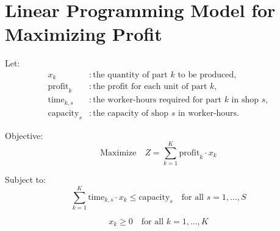 \documentclass{article}
\begin{document}
\section*{Linear Programming Model for Maximizing Profit}

Let:
\begin{align*}
x_k & : \text{the quantity of part } k \text{ to be produced}, \\
\text{profit}_k & : \text{the profit for each unit of part } k, \\
\text{time}_{k,s} & : \text{the worker-hours required for part } k \text{ in shop } s, \\
\text{capacity}_s & : \text{the capacity of shop } s \text{ in worker-hours}.
\end{align*}

Objective:
\[
\text{Maximize} \quad Z = \sum_{k=1}^{K} \text{profit}_k \cdot x_k
\]

Subject to:
\[
\sum_{k=1}^{K} \text{time}_{k,s} \cdot x_k \leq \text{capacity}_s \quad \text{for all } s = 1, \ldots, S
\]

\[
x_k \geq 0 \quad \text{for all } k = 1, \ldots, K
\]
\end{document}
